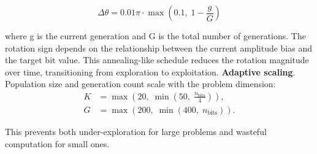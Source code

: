 \begin{equation}
\Delta \theta = 0.01 \pi \cdot \max\!\left(0.1,\; 1 - \frac{g}{G}\right)
\end{equation}

where g is the current generation and G is the total number of generations. The rotation sign depends on the relationship between the current amplitude bias and the target bit value. This annealing-like schedule reduces the rotation magnitude over time, transitioning from exploration to exploitation. \textbf{Adaptive scaling}. Population size and generation count scale with the problem dimension:
\begin{align}
K &= \max\!\left(20,\; \min\!\left(50,\; \frac{n_{\text{bits}}}{4}\right)\right), \\
G &= \max\!\left(200,\; \min\!\left(400,\; n_{\text{bits}}\right)\right).
\end{align}

This prevents both under-exploration for large problems and wasteful computation for small ones.

